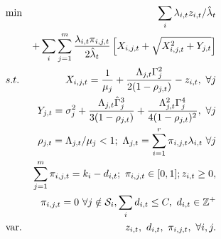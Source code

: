 \begin{eqnarray}
& {\rm min} &  \sum_i \lambda_{i,t}z_{i,t}/\hat{\lambda}_t \nonumber\\&&+ \sum_i \sum_{j=1}^m \frac{\lambda_{i,t}\pi_{i,j,t}}{2\hat{\lambda}_t} \left[ X_{i,j,t} + \sqrt{X_{i,j,t}^2 + Y_{j,t}} \right]  \label{eq:c0} \\
& {s.t.} & X_{i,j,t}=   \frac{1}{\mu_j} + \frac{ \Lambda_{j,t} \Gamma_j^2 }{2(1- \rho_{j,t})}-z_{i,t}, \ \forall j  \label{eq:c1}   \\
&  & Y_{j,t}=  \sigma_j^2+\frac{ \Lambda_{j,t} \hat{\Gamma}_j^3}{3(1-\rho_{j,t})}+\frac{\Lambda_{j,t}^2\Gamma_j^4}{4(1- \rho_{j,t})^2}, \ \forall j \label{eq:c2}  \\
& & \rho_{j,t} = \Lambda_{j,t}/\mu_j < 1; \ \Lambda_{j,t}=\sum_{i=1}^r \pi_{i,j,t}\lambda_{i,t}  \ \forall j \label{eq:c3} \\
&  & \sum_{j=1}^m \pi_{i,j,t} = k_i-d_{i,t}; \ \pi_{i,j,t}\in [0,1]; z_{i,t}\ge 0,\\&& \pi_{i,j,t}=0 \ \forall j\notin \mathcal{S}_i, \sum_i d_{i,t}\le C, \  d_{i,t}\in \mathbb{Z}^+ \label{eq:c4}  \\
& {\rm var.} & z_{i,t}, \ d_{i,t}, \ \pi_{i,j,t}, \ \forall i,j. \nonumber
\end{eqnarray}
